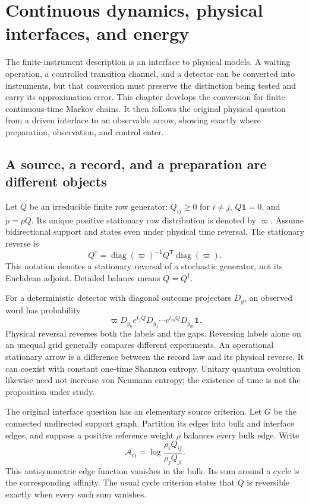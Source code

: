 \chapter{Continuous dynamics, physical interfaces, and energy}
\label{ch:continuous}

The finite-instrument description is an interface to physical models. A waiting
operation, a controlled transition channel, and a detector can be converted
into instruments, but that conversion must preserve the distinction being
tested and carry its approximation error. This chapter develops the conversion
for finite continuous-time Markov chains. It then follows the original physical
question from a driven interface to an observable arrow, showing exactly where
preparation, observation, and control enter.

\section{A source, a record, and a preparation are different objects}

Let $Q$ be an irreducible finite row generator: $Q_{ij}\geq0$ for $i\ne j$,
$Q\mathbf1=0$, and $\dot p=pQ$. Its unique positive stationary row distribution
is denoted by $\varpi$. Assume bidirectional support and states even under
physical time reversal. The stationary reverse is
\begin{equation}
 Q^\dagger=\operatorname{diag}(\varpi)^{-1}Q^{\mathsf T}
                         \operatorname{diag}(\varpi).
 \label{eq:continuous-reverse}
\end{equation}
This notation denotes a stationary reversal of a stochastic generator, not
its Euclidean adjoint. Detailed balance means $Q=Q^\dagger$.

For a deterministic detector with diagonal outcome projectors $D_y$, an
observed word has probability
\begin{equation}
 \varpi D_{y_0}e^{t_1Q}D_{y_1}\cdots e^{t_mQ}D_{y_m}\mathbf1.
 \label{eq:continuous-record}
\end{equation}
Physical reversal reverses both the labels and the gaps. Reversing labels alone
on an unequal grid generally compares different experiments. An operational
stationary arrow is a difference between the record law and its physical
reverse. It can coexist with constant one-time Shannon entropy. Unitary quantum
evolution likewise need not increase von Neumann entropy; the existence of time
is not the proposition under study.

The original interface question has an elementary source criterion. Let $G$
be the connected undirected support graph. Partition its edges into bulk and
interface edges, and suppose a positive reference weight $\rho$ balances every
bulk edge. Write
\begin{equation}
 \mathcal A_{ij}=\log\frac{\rho_iQ_{ij}}{\rho_jQ_{ji}}.
\end{equation}
This antisymmetric edge function vanishes in the bulk. Its sum around a cycle
is the corresponding affinity. The usual cycle criterion
\cite{physics-schnakenberg,physics-polettini} states that $Q$ is reversible
exactly when every such sum vanishes.

